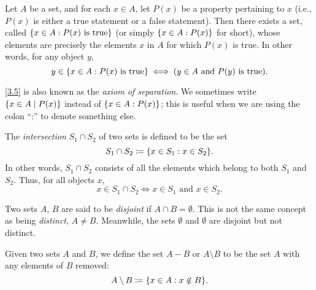 \begin{ax}\label{3.5}
  Let \(A\) be a set, and for each \(x \in A\), let \(P(x)\) be a property pertaining to \(x\) (i.e., \(P(x)\) is either a true statement or a false statement).
  Then there exists a set, called \(\left\lbrace x \in A : P(x) \text{ is true}\right\rbrace\) (or simply \(\left\lbrace x \in A : P(x)\right\rbrace\) for short), whose elements are precisely the elements \(x\) in \(A\) for which \(P(x)\) is true.
  In other words, for any object \(y\),
  \[
    y \in \left\lbrace x \in A : P(x) \text{ is true}\right\rbrace \iff (y \in A \text{ and } P(y) \text{ is true}).
  \]
\end{ax}

\begin{note}
  \cref{3.5} is also known as the \emph{axiom of separation}.
  We sometimes write \(\left\lbrace x \in A \mid P(x)\right\rbrace\) instead of \(\left\lbrace x \in A : P(x)\right\rbrace\);
  this is useful when we are using the colon ``:'' to denote something else.
\end{note}

\setcounter{thm}{22}
\begin{defn}[Intersections]\label{3.1.23}
  The \emph{intersection} \(S_1 \cap S_2\) of two sets is defined to be the set
  \[
    S_1 \cap S_2 \coloneqq \set{x \in S_1 : x \in S_2}.
  \]
  In other words, \(S_1 \cap S_2\) consists of all the elements which belong to both \(S_1\) and \(S_2\).
  Thus, for all objects \(x\),
  \[
    x \in S_1 \cap S_2 \iff x \in S_1 \text{ and } x \in S_2.
  \]
\end{defn}

\begin{note}
  Two sets \(A\), \(B\) are said to be \emph{disjoint} if \(A \cap B = \emptyset\).
  This is not the same concept as being \emph{distinct}, \(A \neq B\).
  Meanwhile, the sets \(\emptyset\) and \(\emptyset\) are disjoint but not distinct.
\end{note}

\setcounter{thm}{26}
\begin{defn}\label{3.1.27}
  Given two sets \(A\) and \(B\), we define the set \(A - B\) or \(A \setminus B\) to be the set \(A\) with any elements of \(B\) removed:
  \[
    A \setminus B \coloneqq \set{x \in A : x \notin B}.
  \]
\end{defn}

